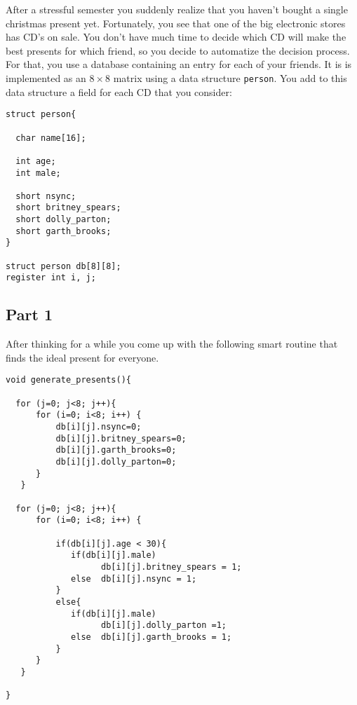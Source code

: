 \begin{problem}{10}
\end{problem}
After a stressful semester you suddenly realize that
you haven't bought a single christmas present yet.
Fortunately, you see that one of the big electronic
stores has CD's on sale.
You don't have much time to decide which CD will make
the best presents for which friend,
so you decide to automatize the decision process.
For that, you use a database containing an entry for each
of your friends.
It is is implemented
as an $8\times8$ matrix using a data structure {\tt person}. 
You add to this data structure a field for each CD that you consider:\\

{\small
\begin{verbatim}
struct person{

  char name[16];

  int age;
  int male;

  short nsync;
  short britney_spears;
  short dolly_parton;
  short garth_brooks;
}

struct person db[8][8];
register int i, j;

\end{verbatim}
}

\newpage
\subsection*{Part 1}
After thinking for a while you come up with the following 
smart routine that finds the ideal present for everyone.

{\small
\begin{verbatim}
void generate_presents(){

  for (j=0; j<8; j++){
      for (i=0; i<8; i++) {
          db[i][j].nsync=0;
          db[i][j].britney_spears=0;
          db[i][j].garth_brooks=0;
          db[i][j].dolly_parton=0;
      }
   }  

  for (j=0; j<8; j++){
      for (i=0; i<8; i++) {        

          if(db[i][j].age < 30){
             if(db[i][j].male)
                   db[i][j].britney_spears = 1;
             else  db[i][j].nsync = 1;
          }
          else{
             if(db[i][j].male) 
                   db[i][j].dolly_parton =1;
             else  db[i][j].garth_brooks = 1;
          }
      }
   }      
  
}
\end{verbatim}
}


